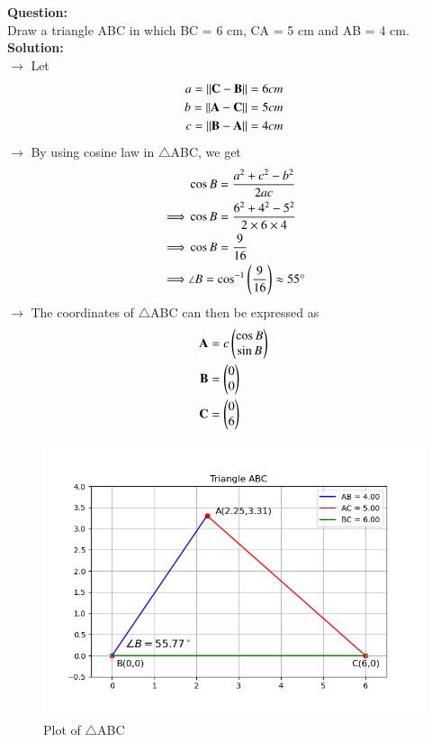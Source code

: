 \documentclass[journal]{IEEEtran}
\begin{document}
\textbf{Question:}\\
Draw a triangle ABC in which BC = 6 cm, CA = 5 cm and AB = 4 cm.\\
\textbf{Solution:}\\
$\rightarrow$ Let
\begin{align}
    a = \left\lVert\mathbf{C} - \mathbf{B}\right\rVert = 6 cm \\
    b = \left\lVert\mathbf{A} - \mathbf{C}\right\rVert = 5 cm \\
    c = \left\lVert\mathbf{B} - \mathbf{A}\right\rVert = 4 cm
\end{align}
$\rightarrow$ By using cosine law in $\triangle$ABC, we get
\begin{align}
    &\cos{B} = \frac{a^{2} + c^{2} - b^{2}}{2ac} \\
    \implies &\cos{B} = \frac{6^2 + 4^2 - 5^2}{2 \times 6 \times 4} \\
    \implies &\cos{B} = \frac{9}{16} \\
    \implies &\angle{B} = \cos^{-1}{\left(\frac{9}{16}\right)} \approx 55 \degree
\end{align}
$\rightarrow$ The coordinates of $\triangle$ABC can then be expressed as
\begin{align}
    \mathbf{A} &= c \begin{pmatrix}\cos{B}\\\sin{B}\end{pmatrix} \\
    \mathbf{B} &= \begin{pmatrix}0\\0\end{pmatrix} \\
    \mathbf{C} &= \begin{pmatrix}0\\6\end{pmatrix}
\end{align}
\begin{figure}[h!]
   \centering
   \includegraphics[width=0.8\linewidth]{figs/01.png}
   \caption{Plot of $\triangle$ABC}
   \label{Plot_1}
\end{figure}
\end{document}

